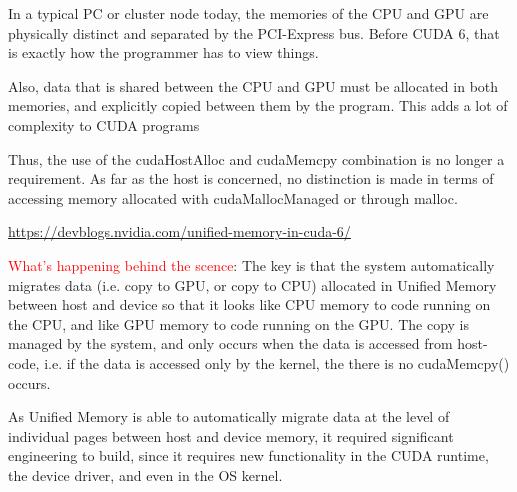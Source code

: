 \begin{mdframed}

In a typical PC or cluster node today, the memories of the CPU and GPU are
physically distinct and separated by the PCI-Express bus. Before CUDA 6, that is
exactly how the programmer has to view things.

Also, data that is shared between the CPU and GPU must be allocated in both
memories, and explicitly copied between them by the program. This adds a lot of
complexity to CUDA programs

Thus, the use of the cudaHostAlloc and cudaMemcpy combination is no longer a
requirement. As far as the host is concerned, no distinction is made in terms of
accessing memory allocated with cudaMallocManaged or through malloc.

\url{https://devblogs.nvidia.com/unified-memory-in-cuda-6/}
\end{mdframed}


\textcolor{red}{What's happening behind the scence}:
The key is that the system automatically migrates data (i.e. copy to GPU, or
copy to CPU) allocated in Unified Memory between host and device so that it
looks like CPU memory to code running on the CPU, and like GPU memory to code
running on the GPU. The copy is managed by the system, and only occurs when the
data is accessed from host-code, i.e. if the data is accessed only by the
kernel, the there is no cudaMemcpy() occurs. 

As Unified Memory is able to automatically migrate data at the level of
individual pages between host and device memory, it required significant
engineering to build, since it requires new functionality in the CUDA runtime,
the device driver, and even in the OS kernel.



